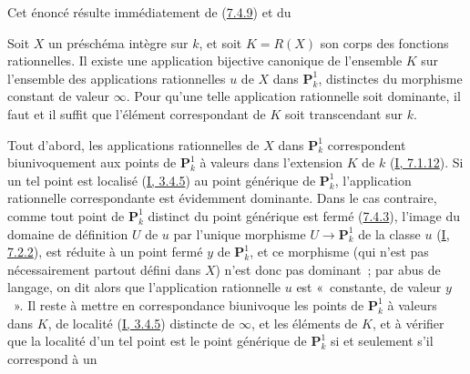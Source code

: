 Cet énoncé résulte immédiatement de (\hyperref[II.7.4.9-fr]{7.4.9}) et du

\begin{lemma}[7.4.15.1]
\label{II.7.4.15.1-fr}
Soit $X$ un préschéma intègre sur $k$, et soit $K=R(X)$ son corps des fonctions
rationnelles. Il existe une application bijective canonique de l'ensemble
$K$ sur l'ensemble des applications rationnelles $u$ de $X$ dans
$\mathbf{P}_k^1$, distinctes du morphisme constant de valeur $\infty$. Pour
qu'une telle application rationnelle soit dominante, il faut et il suffit que
l'élément correspondant de $K$ soit transcendant sur $k$.
\end{lemma}

Tout d'abord, les applications rationnelles de $X$ dans $\mathbf{P}_k^1$
correspondent biunivoquement aux points de $\mathbf{P}_k^1$ à valeurs dans
l'extension $K$ de $k$ (\hyperref[I.7.1.12-fr]{I, 7.1.12}). Si un tel point
est localisé (\hyperref[I.3.4.5-fr]{I, 3.4.5}) au point générique de
$\mathbf{P}_k^1$, l'application rationnelle correspondante est évidemment
dominante. Dans le cas contraire, comme tout point de $\mathbf{P}_k^1$
distinct du point générique est fermé (\hyperref[II.7.4.3-fr]{7.4.3}),
l'image du domaine de définition $U$ de $u$ par l'unique morphisme
$U\to\mathbf{P}_k^1$ de la classe $u$ (\hyperref[I.7.2.2-fr]{I, 7.2.2}),
est réduite à un point fermé $y$ de $\mathbf{P}_k^1$, et ce morphisme (qui
n'est pas nécessairement partout défini dans $X$) n'est donc pas dominant~;
par abus de langage, on dit alors que l'application rationnelle $u$ est
«~constante, de valeur $y$~». Il reste à mettre en correspondance biunivoque
les points de $\mathbf{P}_k^1$ à valeurs dans $K$, de localité
(\hyperref[I.3.4.5-fr]{I, 3.4.5}) distincte de $\infty$, et les éléments de
$K$, et à vérifier que la localité d'un tel point est le point générique de
$\mathbf{P}_k^1$ si et seulement s'il correspond à un

